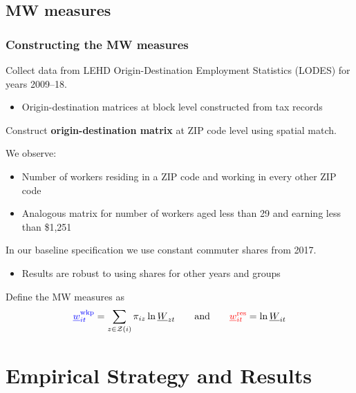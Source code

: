 \documentclass[aspectratio=169, t]{beamer}
\newcommand{\Z}{\mathcal{Z}}
\newcommand{\MW}{\underline{W}}
\newcommand{\mw}{\underline{w}}
\newcommand{\wkp}{\text{wkp}}
\newcommand{\res}{\text{res}}
\begin{document}
\subsection{MW measures}

\begin{frame}
    \frametitle{Constructing the MW measures}
        
    Collect data from LEHD Origin-Destination Employment Statistics (LODES) for years 2009--18.
    \begin{itemize}
        \item Origin-destination matrices at block level constructed from tax records
    \end{itemize}

    \vspace{1mm}
    Construct \textbf{origin-destination matrix} at ZIP code level using spatial match.
    
    \pause
    \vspace{2mm}
    We observe:
    \begin{itemize} \small
        \item Number of workers residing in a ZIP code and working in every other ZIP code
        \item Analogous matrix for number of workers aged less than 29 and earning less than 
        \$1,251
    \end{itemize}
    
    \vspace{1mm}
    In our baseline specification we use constant commuter shares from 2017.
    \begin{itemize} \small
        \item Results are robust to using shares for other years and groups
    \end{itemize}

    \pause
    \vspace{4mm}
    Define the MW measures as
    $$
    {\color{blue} \mw^{\wkp}_{it}} = \sum_{z \in \Z(i)} \pi_{i z} \ln \MW_{zt}
    \quad\quad\text{and}\quad\quad
    {\color{red} \mw^{\res}_{it}} = \ln \MW_{it}
    $$
\end{frame}

\section{Empirical Strategy and Results}
\end{document}
